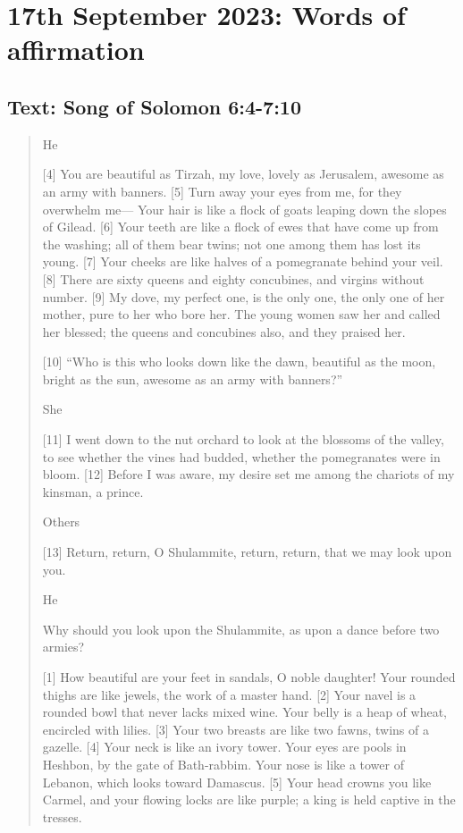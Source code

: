 \setcounter{figure}{0}

\section{17th September 2023: Words of affirmation}
\subsection*{Text: Song of Solomon 6:4-7:10}
  \begin{quote}
    He

    [4] You are beautiful as Tirzah, my love,
        lovely as Jerusalem,
        awesome as an army with banners.
    [5] Turn away your eyes from me,
        for they overwhelm me—
    Your hair is like a flock of goats
        leaping down the slopes of Gilead.
    [6] Your teeth are like a flock of ewes
        that have come up from the washing;
    all of them bear twins;
        not one among them has lost its young.
    [7] Your cheeks are like halves of a pomegranate
        behind your veil.
    [8] There are sixty queens and eighty concubines,
        and virgins without number.
    [9] My dove, my perfect one, is the only one,
        the only one of her mother,
        pure to her who bore her.
    The young women saw her and called her blessed;
        the queens and concubines also, and they praised her.


    [10] “Who is this who looks down like the dawn,
        beautiful as the moon, bright as the sun,
        awesome as an army with banners?”


    She

    [11] I went down to the nut orchard
        to look at the blossoms of the valley,
    to see whether the vines had budded,
        whether the pomegranates were in bloom.
    [12] Before I was aware, my desire set me
        among the chariots of my kinsman, a prince.


    Others

    [13] Return, return, O Shulammite,
        return, return, that we may look upon you.


    He

    Why should you look upon the Shulammite,
        as upon a dance before two armies?


    [1] How beautiful are your feet in sandals,
        O noble daughter!
    Your rounded thighs are like jewels,
        the work of a master hand.
    [2] Your navel is a rounded bowl
        that never lacks mixed wine.
    Your belly is a heap of wheat,
        encircled with lilies.
    [3] Your two breasts are like two fawns,
        twins of a gazelle.
    [4] Your neck is like an ivory tower.
    Your eyes are pools in Heshbon,
        by the gate of Bath-rabbim.
    Your nose is like a tower of Lebanon,
        which looks toward Damascus.
    [5] Your head crowns you like Carmel,
        and your flowing locks are like purple;
        a king is held captive in the tresses.



\end{quote}
